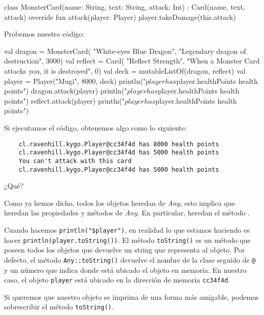   \begin{kotlin}
    class MonsterCard(name: String, text: String, attack: Int) : Card(name, text, attack) {
      override fun attack(player: Player) {
        player.takeDamage(this.attack)
      }
    }
  \end{kotlin}

  Probemos nuestro código:

  \begin{kotlin}
    val dragon = MonsterCard(
      "White-eyes Blue Dragon", "Legendary dragon of destruction", 3000)
    val reflect = Card(
      "Reflect Strength", "When a Monster Card attacks you, it is destroyed", 0)
    val deck = mutableListOf(dragon, reflect)
    val player = Player("Mugi", 8000, deck)
    println("$player has ${player.healthPoints} health points")
    dragon.attack(player)
    println("$player has ${player.healthPoints} health points")
    reflect.attack(player)
    println("$player has ${player.healthPoints} health points")
  \end{kotlin}

  Si ejecutamos el código, obtenemos algo como lo siguiente:

  \begin{verbatim}
    cl.ravenhill.kygo.Player@cc34f4d has 8000 health points
    cl.ravenhill.kygo.Player@cc34f4d has 5000 health points
    You can't attack with this card
    cl.ravenhill.kygo.Player@cc34f4d has 5000 health points
  \end{verbatim}

  \begin{center}
    ¿Qué?
  \end{center}

  Como ya hemos dicho, todos los objetos heredan de \textit{Any}, esto implica que heredan las 
  propiedades y métodos de \textit{Any}.
  En particular, heredan el método .

  Cuando hacemos \texttt{println("\$player")}, en realidad lo que estamos haciendo es hacer 
  \texttt{println(player.toString())}.
  El método \texttt{toString()} es un método que poseen todos los objetos que devuelve un string
  que representa al objeto.
  Por defecto, el método \texttt{Any::toString()} devuelve el nombre de la clase seguido
  de \texttt{@} y un número que indica donde está ubicado el objeto en memoria.
  En nuestro caso, el objeto \texttt{player} está ubicado en la dirección de memoria 
  \texttt{cc34f4d}.

  \begin{defaultbox}
    Si queremos que nuestro objeto se imprima de una forma más amigable, podemos sobrescribir el
    método \texttt{toString()}.
  \end{defaultbox}

